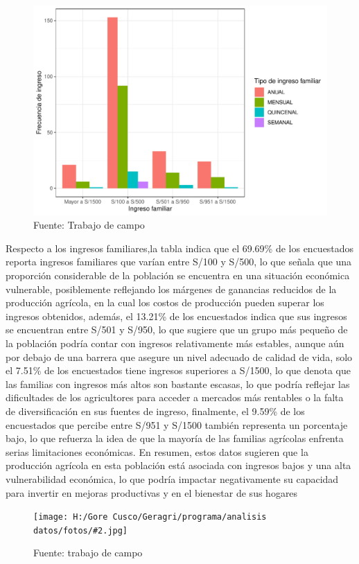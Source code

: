 \documentclass{article}\usepackage[]{graphicx}\usepackage[table]{xcolor}
\makeatletter
\def\maxwidth{ %
  \ifdim\Gin@nat@width>\linewidth
    \linewidth
  \else
    \Gin@nat@width
  \fi
}
\newenvironment{knitrout}{}{} %
\newenvironment{fotos}[2]
{\begin{figure}[H]
	\centering
	\caption{#1}
	\texttt{[image: H:/Gore Cusco/Geragri/programa/analisis datos/fotos/\#2.jpg]}
	\caption*{Fuente: trabajo de campo}}
{\end{figure}}
\makeatother
\begin{document}
\begin{figure}[H]
  \centering
  \caption{Distribucion del tipo de ingreso familiar}
\begin{knitrout}
\color{fgcolor}
\includegraphics[width=\maxwidth]{figure/fig_seis-1} 
\end{knitrout}
  \caption*{Fuente: Trabajo de campo}
\end{figure}
Respecto a los ingresos familiares,la tabla indica que el 69.69\% de los encuestados reporta ingresos familiares que varían entre S/100 y S/500, lo que señala que una proporción considerable de la población se encuentra en una situación económica vulnerable, posiblemente reflejando los márgenes de ganancias reducidos de la producción agrícola, en la cual los costos de producción pueden superar los ingresos obtenidos, además, el 13.21\% de los encuestados indica que sus ingresos se encuentran entre S/501 y S/950, lo que sugiere que un grupo más pequeño de la población podría contar con ingresos relativamente más estables, aunque aún por debajo de una barrera que asegure un nivel adecuado de calidad de vida, solo el 7.51\% de los encuestados tiene ingresos superiores a S/1500, lo que denota que las familias con ingresos más altos son bastante escasas, lo que podría reflejar las dificultades de los agricultores para acceder a mercados más rentables o la falta de diversificación en sus fuentes de ingreso, finalmente, el 9.59\% de los encuestados que percibe entre S/951 y S/1500 también representa un porcentaje bajo, lo que refuerza la idea de que la mayoría de las familias agrícolas enfrenta serias limitaciones económicas. En resumen, estos datos sugieren que la producción agrícola en esta población está asociada con ingresos bajos y una alta vulnerabilidad económica, lo que podría impactar negativamente su capacidad para invertir en mejoras productivas y en el bienestar de sus hogares
\begin{fotos}
{Sensibililzacion a los beneficiarios}{4}
\end{fotos}
\end{document}
